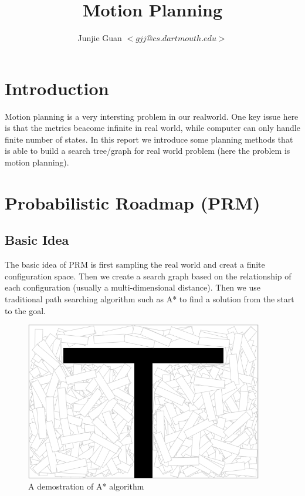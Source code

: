 \documentclass{article}
\title{Motion Planning}
\author{Junjie Guan $<gjj@cs.dartmouth.edu>$}
\begin{document}
\maketitle

\tableofcontents

\section{Introduction}

Motion planning is a very intersting problem in our realworld. One key issue here is that the metrics beacome infinite in real world, while computer can only handle finite number of states. In this report we introduce some planning methods that is able to build a search tree/graph for real world problem (here the problem is motion planning).













\clearpage
\section{Probabilistic Roadmap (PRM)}
\subsection{Basic Idea}

The basic idea of PRM is first sampling the real world and creat a finite configuration space. Then we create a search graph based on the relationship of each configuration (usually a multi-dimensional distance). Then we use traditional path searching algorithm such as A* to find a solution from the start to the goal.

\begin{figure}[!h]
\centering
\includegraphics[width=0.927\textwidth]{sample.png}
\caption{A demostration of A* algorithm}
\label{sampling}
\end{figure}
\end{document}
